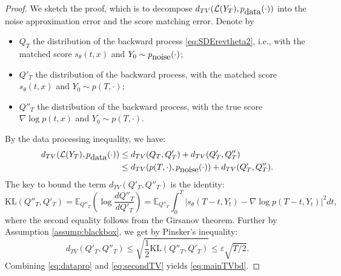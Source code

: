 \documentclass[letterpaper,11pt,reqno]{amsart}
\numberwithin{equation}{section}
\begin{document}
\begin{proof}
We sketch the proof, which is to decompose $d_{TV}(\mathcal{L}(Y_T), p_{\tiny \mbox{data}}(\cdot))$
into the noise approximation error and the score matching error.
Denote by 
\begin{itemize}[itemsep = 3 pt]
\item
$Q_T$ the distribution of the backward process \eqref{eq:SDErevtheta2}, 
i.e., with the matched score $s_\theta(t,x)$ and $Y_0 \sim p_{\tiny \mbox{noise}}(\cdot)$;
\item
$Q'_T$ the distribution of the backward process, 
with the matched score $s_\theta(t,x)$ and $Y_0 \sim p(T, \cdot)$;
\item
$Q''_T$ the distribution of the backward process,
with the true score $\nabla \log p(t,x)$ and $Y_0 \sim p(T, \cdot)$.
\end{itemize}
By the data processing inequality, we have:
\begin{equation}
\label{eq:datapro}
\begin{aligned}
d_{TV}(\mathcal{L}(Y_T), p_{\tiny \mbox{data}}(\cdot))
& \le d_{TV}(Q_T, Q'_T) + d_{TV}(Q'_T, Q''_T) \\
& \le d_{TV}(p(T, \cdot), p_{\tiny \mbox{noise}}(\cdot)) +  d_{TV}(Q'_T, Q''_T).
\end{aligned}
\end{equation}
The key to bound the term $d_{TV}(Q'_T, Q''_T)$
is the identity:
\begin{equation}
\label{eq:KLGir}
\mbox{KL}(Q''_T, Q'_T) = \mathbb{E}_{Q''_T} \left( \log \frac{dQ''_T}{dQ'_T}\right)
= \mathbb{E}_{Q''_T} \int_0^T |s_{\theta}(T-t, Y_t) - \nabla \log  p (T-t, Y_t)|^2 dt,
\end{equation}
where the second equality follows from the Girsanov theorem. 
Further by Assumption \ref{assump:blackbox},
we get by Pinsker's inequality:
\begin{equation}
\label{eq:secondTV}
d_{TV}(Q'_T, Q''_T) \le \sqrt{\frac{1}{2} \mbox{KL}(Q''_T, Q'_T)}
\le \varepsilon \sqrt{T/2}.
\end{equation}
Combining \eqref{eq:datapro} and \eqref{eq:secondTV} yields \eqref{eq:mainTVbd}.
\end{proof}
\end{document}
